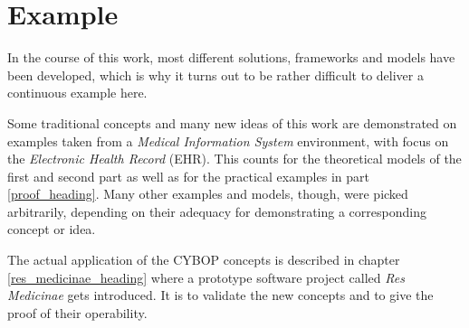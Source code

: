 %
%
%
%
%
%
%

\section{Example}
\label{example_heading}

In the course of this work, most different solutions, frameworks and models
have been developed, which is why it turns out to be rather difficult to
deliver a continuous example here.

Some traditional concepts and many new ideas of this work are demonstrated on
examples taken from a \emph{Medical Information System} environment, with focus
on the \emph{Electronic Health Record} (EHR). This counts for the theoretical
models of the first and second part as well as for the practical examples in
part \ref{proof_heading}. Many other examples and models, though, were picked
arbitrarily, depending on their adequacy for demonstrating a corresponding
concept or idea.

The actual application of the CYBOP concepts is described in chapter
\ref{res_medicinae_heading} where a prototype software project called
\emph{Res Medicinae} gets introduced. It is to validate the new concepts and to
give the proof of their operability.
